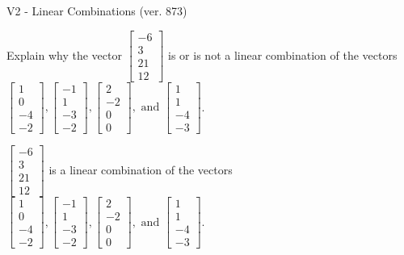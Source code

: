 \begin{exercise}
  \begin{exerciseTitle}V2 - Linear Combinations (ver. 873)\end{exerciseTitle}
  \begin{exerciseStatement}
    Explain why the vector \(\left[\begin{array}{c}
-6 \\
3 \\
21 \\
12
\end{array}\right]\)  is or is not a linear 
	combination of the vectors \(\left[\begin{array}{c}
1 \\
0 \\
-4 \\
-2
\end{array}\right] , \left[\begin{array}{c}
-1 \\
1 \\
-3 \\
-2
\end{array}\right] , \left[\begin{array}{c}
2 \\
-2 \\
0 \\
0
\end{array}\right] , \text{ and } \left[\begin{array}{c}
1 \\
1 \\
-4 \\
-3
\end{array}\right]\).
	


  \end{exerciseStatement}
  \begin{exerciseAnswer}
   \(\left[\begin{array}{c}
-6 \\
3 \\
21 \\
12
\end{array}\right]\) 
  	 is  
	a linear combination of the vectors \(\left[\begin{array}{c}
1 \\
0 \\
-4 \\
-2
\end{array}\right] , \left[\begin{array}{c}
-1 \\
1 \\
-3 \\
-2
\end{array}\right] , \left[\begin{array}{c}
2 \\
-2 \\
0 \\
0
\end{array}\right] , \text{ and } \left[\begin{array}{c}
1 \\
1 \\
-4 \\
-3
\end{array}\right]\).


\end{exerciseAnswer}
\end{exercise}
